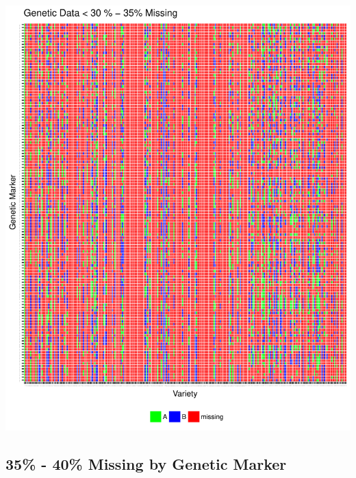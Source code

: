 \documentclass[11pt]{article}\usepackage[]{graphicx}\usepackage[]{color}
\makeatletter
\def\maxwidth{ %
  \ifdim\Gin@nat@width>\linewidth
    \linewidth
  \else
    \Gin@nat@width
  \fi
}
\newenvironment{knitrout}{}{} %
\makeatother
\begin{document}
\begin{knitrout}\footnotesize
{}\color{fgcolor}

{\centering \includegraphics[width=\maxwidth]{figure/missing_plot35-1} 

}



\end{knitrout}
\pagebreak
\subsection{35\% - 40\% Missing by Genetic Marker}
\end{document}
